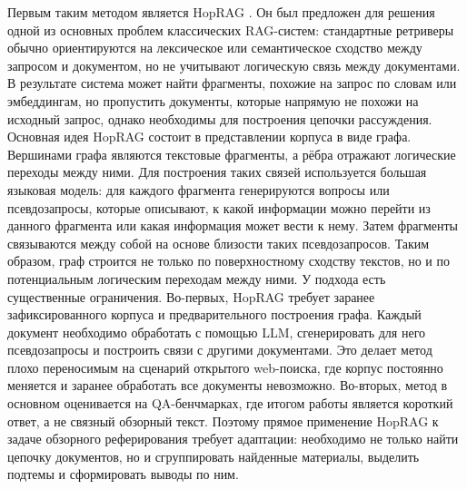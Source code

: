 \documentclass[oneside,senior,etd]{BYUPhys}
\begin{document}
Первым таким методом является HopRAG \cite{liu2025hoprag}. 
Он был предложен для решения одной из основных проблем классических RAG-систем: 
стандартные ретриверы обычно ориентируются на лексическое или семантическое сходство между запросом и документом, но не учитывают логическую связь между документами. 
В результате система может найти фрагменты, похожие на запрос по словам или эмбеддингам, но пропустить документы, которые напрямую не похожи на исходный запрос, однако необходимы для построения цепочки рассуждения.
Основная идея HopRAG состоит в представлении корпуса в виде графа. 
Вершинами графа являются текстовые фрагменты, а рёбра отражают логические переходы между ними. 
Для построения таких связей используется большая языковая модель: для каждого фрагмента генерируются вопросы или псевдозапросы, которые описывают, к какой информации можно перейти из данного фрагмента или какая информация может вести к нему. 
Затем фрагменты связываются между собой на основе близости таких псевдозапросов. 
Таким образом, граф строится не только по поверхностному сходству текстов, но и по потенциальным логическим переходам между ними.
У подхода есть существенные ограничения. 
Во-первых, HopRAG требует заранее зафиксированного корпуса и предварительного построения графа. 
Каждый документ необходимо обработать с помощью LLM, сгенерировать для него псевдозапросы и построить связи с другими документами. 
Это делает метод плохо переносимым на сценарий открытого web-поиска, где корпус постоянно меняется и заранее обработать все документы невозможно. 
Во-вторых, метод в основном оценивается на QA-бенчмарках, где итогом работы является короткий ответ, а не связный обзорный текст. 
Поэтому прямое применение HopRAG к задаче обзорного реферирования требует адаптации: 
необходимо не только найти цепочку документов, но и сгруппировать найденные материалы, 
выделить подтемы и сформировать выводы по ним.
\end{document}
